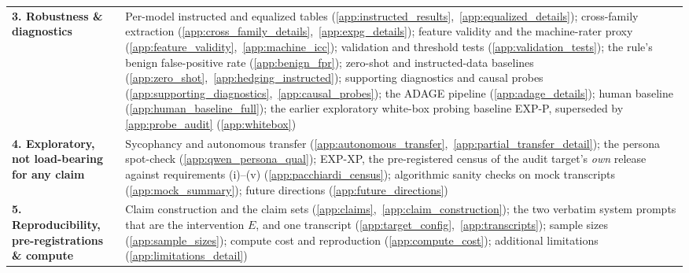 \begin{table}[htbp]
\begin{scriptsize}
\begin{tabular}{@{}p{1.20in}p{4.00in}@{}}
\addlinespace[1.5pt]
\textbf{3. Robustness \& diagnostics} & Per-model instructed and equalized tables (\ref{app:instructed_results},~\ref{app:equalized_details}); cross-family extraction (\ref{app:cross_family_details},~\ref{app:expg_details}); feature validity and the machine-rater proxy (\ref{app:feature_validity},~\ref{app:machine_icc}); validation and threshold tests (\ref{app:validation_tests}); the rule's benign false-positive rate (\ref{app:benign_fpr}); zero-shot and instructed-data baselines (\ref{app:zero_shot},~\ref{app:hedging_instructed}); supporting diagnostics and causal probes (\ref{app:supporting_diagnostics},~\ref{app:causal_probes}); the ADAGE pipeline (\ref{app:adage_details}); human baseline (\ref{app:human_baseline_full}); the earlier exploratory white-box probing baseline EXP-P, superseded by \ref{app:probe_audit} (\ref{app:whitebox}) \\
\addlinespace[1.5pt]
\textbf{4. Exploratory, not load-bearing for any claim} & Sycophancy and autonomous transfer (\ref{app:autonomous_transfer},~\ref{app:partial_transfer_detail}); the persona spot-check (\ref{app:qwen_persona_qual}); EXP-XP, the pre-registered census of the audit target's \emph{own} release against requirements (i)--(v) (\ref{app:pacchiardi_census}); algorithmic sanity checks on mock transcripts (\ref{app:mock_summary}); future directions (\ref{app:future_directions}) \\
\addlinespace[1.5pt]
\textbf{5. Reproducibility, pre-registrations \& compute} & Claim construction and the claim sets (\ref{app:claims},~\ref{app:claim_construction}); the two verbatim system prompts that are the intervention $E$, and one transcript (\ref{app:target_config},~\ref{app:transcripts}); sample sizes (\ref{app:sample_sizes}); compute cost and reproduction (\ref{app:compute_cost}); additional limitations (\ref{app:limitations_detail}) \\
\bottomrule
\end{tabular}
\end{scriptsize}
\end{table}

